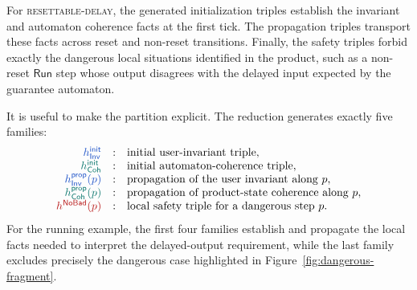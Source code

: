 \documentclass[acmsmall,screen]{acmart}
\theoremstyle{leftplain}
\theoremstyle{leftdefinition}
\theoremstyle{leftremark}
\begin{document}
\noindent{}
For \textsc{resettable-delay}, the generated initialization triples establish
the invariant and automaton coherence facts at the first tick. The propagation
triples transport these facts across reset and non-reset transitions. Finally,
the safety triples forbid exactly the dangerous local situations identified in
the product, such as a non-reset $\mathsf{Run}$ step whose output disagrees
with the delayed input expected by the guarantee automaton.

It is useful to make the partition explicit. The reduction generates exactly
five families:
\[
\begin{array}{rcl}
\tripleinv{h^{\mathsf{init}}_{\NodeInv}}
  &:& \text{initial user-invariant triple},\\
\triplecoh{h^{\mathsf{init}}_{\Coherence}}
  &:& \text{initial automaton-coherence triple},\\
\tripleinv{h^{\mathsf{prop}}_{\NodeInv}(p)}
  &:& \text{propagation of the user invariant along } p,\\
\triplecoh{h^{\mathsf{prop}}_{\Coherence}(p)}
  &:& \text{propagation of product-state coherence along } p,\\
\triplesafe{h^{\NoBad}(p)}
  &:& \text{local safety triple for a dangerous step } p.
\end{array}
\]
For the running example, the first four families establish and propagate the
local facts needed to interpret the delayed-output requirement, while the last
family excludes precisely the dangerous case highlighted in
Figure~\ref{fig:dangerous-fragment}.
\end{document}
